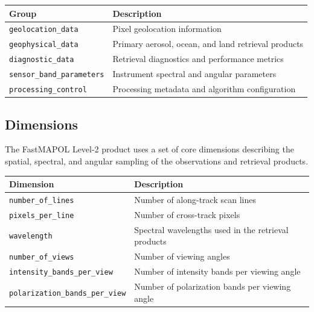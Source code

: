 \documentclass[
  11pt,
  letterpaper,
]{scrreprt}
\begin{document}
\begin{longtable}[]{@{}
  >{\raggedright\arraybackslash}p{}
  >{\raggedright\arraybackslash}p{}@{}}
\toprule\noalign{}
\begin{minipage}[b]{\linewidth}\raggedright
Group
\end{minipage} & \begin{minipage}[b]{\linewidth}\raggedright
Description
\end{minipage} \\
\midrule\noalign{}
\endhead
\bottomrule\noalign{}
\endlastfoot
\texttt{geolocation\_data} & Pixel geolocation information \\
\texttt{geophysical\_data} & Primary aerosol, ocean, and land retrieval
products \\
\texttt{diagnostic\_data} & Retrieval diagnostics and performance
metrics \\
\texttt{sensor\_band\_parameters} & Instrument spectral and angular
parameters \\
\texttt{processing\_control} & Processing metadata and algorithm
configuration \\
\end{longtable}

\subsection{Dimensions}\label{dimensions}

The FastMAPOL Level-2 product uses a set of core dimensions describing
the spatial, spectral, and angular sampling of the observations and
retrieval products.

\begin{longtable}[]{@{}
  >{\raggedright\arraybackslash}p{}
  >{\raggedright\arraybackslash}p{}@{}}
\toprule\noalign{}
\begin{minipage}[b]{\linewidth}\raggedright
Dimension
\end{minipage} & \begin{minipage}[b]{\linewidth}\raggedright
Description
\end{minipage} \\
\midrule\noalign{}
\endhead
\bottomrule\noalign{}
\endlastfoot
\texttt{number\_of\_lines} & Number of along-track scan lines \\
\texttt{pixels\_per\_line} & Number of cross-track pixels \\
\texttt{wavelength} & Spectral wavelengths used in the retrieval
products \\
\texttt{number\_of\_views} & Number of viewing angles \\
\texttt{intensity\_bands\_per\_view} & Number of intensity bands per
viewing angle \\
\texttt{polarization\_bands\_per\_view} & Number of polarization bands
per viewing angle \\
\end{longtable}
\end{document}
